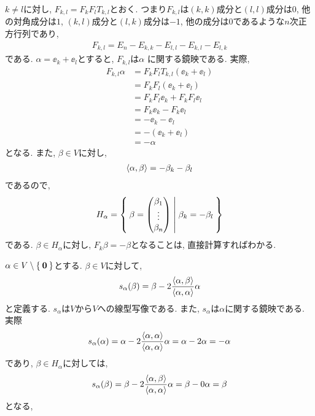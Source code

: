 \begin{example}
  $k\neq l$に対し,
  $F_{k,l}=F_kF_lT_{k,l}$とおく.
  つまり$F_{k,l}$は$(k,k)$成分と$(l,l)$成分は$0$, 他の対角成分は$1$,
  $(k,l)$成分と$(l,k)$成分は$-1$, 他の成分は$0$であるような$n$次正方行列であり,
  \begin{align*}
    F_{k,l} = E_n-E_{k,k}-E_{l,l}-E_{k,l}-E_{l,k}
  \end{align*}
  である.
  $\alpha=\ee_k+\ee_l$とすると, $F_{k,l}$は$\alpha$ に関する鏡映である.
  実際,
  \begin{align*}
    F_{k,l} \alpha &= F_kF_lT_{k,l}(\ee_k+\ee_l)\\
    &= F_kF_l(\ee_k+\ee_l)\\
    &= F_kF_l\ee_k+F_kF_l\ee_l\\
    &= F_k\ee_k-F_k\ee_l\\
    &= -\ee_k-\ee_l\\
    &= -(\ee_k+\ee_l)\\
    &= -\alpha
  \end{align*}
  となる.
  また, $\beta\in V$に対し,
  \begin{align*}
    \Braket{\alpha,\beta}= -\beta_k-\beta_l 
  \end{align*}
  であるので,
  \begin{align*}
    H_\alpha = \Set{
      \beta=
      \begin{pmatrix}
        \beta_1\\
        \vdots\\
        \beta_n
      \end{pmatrix}
      | \beta_k=-\beta_l}
  \end{align*}
  である.  $\beta\in H_\alpha$に対し, 
  $F_k \beta = -\beta$となることは, 直接計算すればわかる.
\end{example}

\begin{example}
  $\alpha\in V\setminus\Set{\boldsymbol{0}}$とする.
  $\beta\in V$に対して,
  \begin{align*}
    s_\alpha (\beta) = \beta - 2\frac{\Braket{\alpha,\beta}}{\Braket{\alpha,\alpha}}\alpha
  \end{align*}
  と定義する. $s_\alpha$は$V$から$V$への線型写像である.
  また, $s_\alpha$は$\alpha$に関する鏡映である.
  実際
  \begin{align*}
    s_\alpha (\alpha) = \alpha - 2\frac{\Braket{\alpha,\alpha}}{\Braket{\alpha,\alpha}}\alpha
      = \alpha - 2\alpha=-\alpha
  \end{align*}
であり, $\beta\in H_\alpha$に対しては,  
  \begin{align*}
    s_\alpha (\beta) = \beta - 2\frac{\Braket{\alpha,\beta}}{\Braket{\alpha,\alpha}}\alpha
    = \beta - 0\alpha =\beta
  \end{align*}
  となる,
\end{example}

